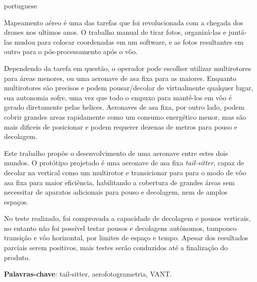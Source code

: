 
\setlength{\absparsep}{18pt} %
\begin{resumo}[Resumo]
 \begin{otherlanguage*}{portuguese}

Mapeamento aéreo é uma das tarefas que foi revolucionada com a chegada dos drones nos ultimos anos.
%
O trabalho manual de tirar fotos, organizá-las e juntá-las mudou para colocar coordenadas em um software, e as fotos resultantes em outro para o pós-processamento após o vôo.
%

Dependendo da tarefa em questão, o operador pode escolher utilizar multirotores para áreas menores, ou uma aeronave de asa fixa para as maiores.
%
Enquanto multirotores são precisos e podem pousar/decolar de virtualmente qualquer lugar, sua autonomia sofre, uma vez que todo o empuxo para mantê-los em vôo é gerado diretamente pelas helices.
%
Aeronaves de asa fixa, por outro lado, podem cobrir grandes areas rapidamente como um consumo energético menor, mas são mais dificeis de posicionar e podem requerer dezenas de metros para pouso e decolagem.

%
Este trabalho propõe o desenvolvimento de uma aeronave entre estes dois mundos.
%
O protótipo projetado é uma aeronave de asa fixa \textit{tail-sitter}, capaz de decolar na vertical como um multirotor e transicionar para para o modo de vôo asa fixa para maior eficiência, habilitando a cobertura de grandes áreas sem necessitar de aparatos adicionais para pouso e decolagem, nem de amplos espaços.
%

No teste realizado, foi comprovada a capacidade de decolagem e pousos verticais, no entanto não foi possível testar pousos e decolagens autônomos, tampouco transição e vôo horizontal, por limites de espaço e tempo. Apesar dos resultados parciais serem positivos, mais testes serão conduzidos até a finalização do produto.
%


 \textbf{Palavras-chave}: tail-sitter, aerofotogrametria, VANT.
  \end{otherlanguage*}
\end{resumo}

